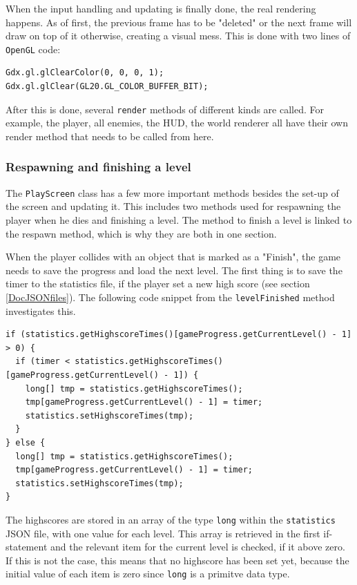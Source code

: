 \documentclass[12p]{article}
\begin{document}
When the input handling and updating is finally done, the real rendering happens. As of first, the previous frame has to be "deleted" or the next frame will draw on top of it otherwise, creating a visual mess. This is done with two lines of \texttt{OpenGL} code:

\begin{verbatim}
Gdx.gl.glClearColor(0, 0, 0, 1);
Gdx.gl.glClear(GL20.GL_COLOR_BUFFER_BIT);
\end{verbatim}

After this is done, several \texttt{render} methods of different kinds are called. For example, the player, all enemies, the HUD, the world renderer all have their own render method that needs to be called from here.

\subsubsection{Respawning and finishing a level}

The \texttt{PlayScreen} class has a few more important methods besides the set-up of the screen and updating it. This includes two methods used for respawning the player when he dies and finishing a level. The method to finish a level is linked to the respawn method, which is why they are both in one section.

When the player collides with an object that is marked as a "Finish", the game needs to save the progress and load the next level. The first thing is to save the timer to the statistics file, if the player set a new high score (see section \ref{DocJSONfiles}). The following code snippet from the \texttt{levelFinished} method investigates this.

\begin{verbatim}
if (statistics.getHighscoreTimes()[gameProgress.getCurrentLevel() - 1] > 0) {
  if (timer < statistics.getHighscoreTimes()[gameProgress.getCurrentLevel() - 1]) {
    long[] tmp = statistics.getHighscoreTimes();
    tmp[gameProgress.getCurrentLevel() - 1] = timer;
    statistics.setHighscoreTimes(tmp);
  }
} else {
  long[] tmp = statistics.getHighscoreTimes();
  tmp[gameProgress.getCurrentLevel() - 1] = timer;
  statistics.setHighscoreTimes(tmp);
}
\end{verbatim}

The highscores are stored in an array of the type \texttt{long} within the \texttt{statistics} JSON file, with one value for each level. This array is retrieved in the first if-statement and the relevant item for the current level is checked, if it above zero. If this is not the case, this means that no highscore has been set yet, because the initial value of each item is zero since \texttt{long} is a primitve data type. 
\end{document}
